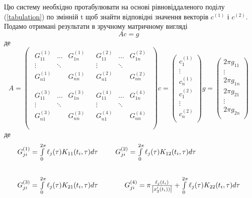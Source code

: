 \documentclass[14pt,a4paper]{extarticle}
\newcounter{e}
\numberwithin{equation}{section}
\newcommand{\intl}{\int\limits}
\newcommand{\inttwopi}{\intl_{0}^{2\pi}}
\begin{document}
 Цю систему необхідно протабулювати на основі рівновіддаленого поділу (\ref{tabulation}) по змінній t щоб знайти відповідні значення векторів $c^{(1)}$ і $c^{(2)}$.
 Подамо отримані результати в зручному матричному вигляді
 $$
 Ac=g
 $$
 де
 $$
 A =
 \begin{pmatrix}
	 \begin{matrix}
	 	G^{(1)}_{11} & \dots  & G^{(1)}_{1n} \\
	 	\vdots 		 & \ddots & \\
	 	G^{(1)}_{n1} & 		  & G^{(1)}_{nn} \\
	 \end{matrix} &
	 \begin{matrix}
	 	G^{(2)}_{11} & \dots  & G^{(2)}_{1n} \\
	 	\vdots 		 & \ddots & \\
	 	G^{(2)}_{n1} & 		  & G^{(2)}_{nn} \\
	 \end{matrix} \\[1cm]
	 \begin{matrix}
		G^{(3)}_{11} & \dots  & G^{(3)}_{1n} \\
		\vdots 		 & \ddots & \\
		G^{(3)}_{n1} & 		  & G^{(3)}_{nn} \\
	 \end{matrix} &
	 \begin{matrix}
		G^{(4)}_{11} & \dots  & G^{(4)}_{1n} \\
		\vdots 		 & \ddots & \\
		G^{(4)}_{n1} & 		  & G^{(4)}_{nn} \\
	 \end{matrix} \\
 \end{pmatrix}
 c = 
 \begin{pmatrix}
	c^{(1)}_1\\
	\vdots\\
	c^{(1)}_n\\[0.5cm]
	c^{(2)}_1\\
	\vdots\\
	c^{(2)}_n\\
 \end{pmatrix}
 g = 
 \begin{pmatrix}
	2\pi g_{11}\\
	\vdots\\
	2\pi g_{1n}\\[0.5cm]
	2\pi g_{21}\\
	\vdots\\
	2\pi g_{2n}\\
 \end{pmatrix}
 $$
 де
 $$
 \begin{matrix}
	G^{(1)}_{ji} = \inttwopi \ell_{j}(\tau) K_{11}(t_i, \tau) d \tau & \hspace{-1.7cm}
	G^{(2)}_{ji} = \inttwopi \ell_{j}(\tau) K_{12}(t_i, \tau) d \tau \\[1cm]
	G^{(3)}_{ji} = \inttwopi \ell_{j}(\tau) K_{21}(t_i, \tau) d \tau & \hspace{1cm}
	G^{(4)}_{ji} = \pi\frac{\ell_{j}(t_i)}{\abs{x'_{2}(t_i))}}
				 + \inttwopi \ell_{j}(\tau) K_{22}(t_i, \tau) d \tau \\
 \end{matrix}
 $$
 
\end{document}
